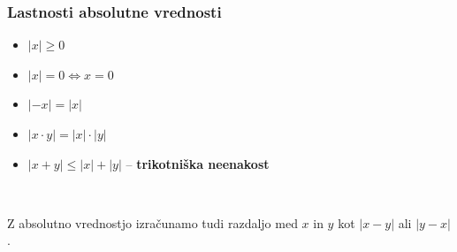        \subsubsection*{Lastnosti absolutne vrednosti}
                    \begin{itemize}
                        \item $|x|\geq 0$
                        \item $|x|=0 \Leftrightarrow x=0$
                        \item $|-x|=|x|$
                        \item $|x\cdot y|=|x|\cdot|y|$
                        \item $|x+y|\leq |x|+|y|$ -- \textbf{trikotniška neenakost}
                    \end{itemize}

        ~

        
            Z absolutno vrednostjo izračunamo tudi razdaljo med $x$ in $y$ kot $|x-y|$ ali $|y-x|$.
        
    ~~~\\



